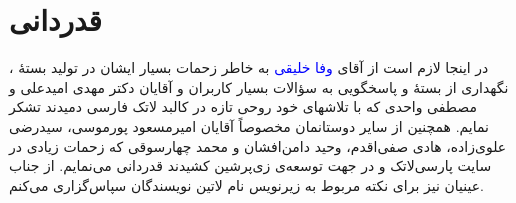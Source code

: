 \documentclass{article}
\theoremstyle{plain}\newtheorem{question}{پرسش}
\begin{document}
\section*{قدردانی}
در اینجا لازم است از آقای \textcolor{blue}{وفا خلیقی} به خاطر زحمات بسیار ایشان در تولید بستهٔ \XePersian، نگهداری از بستهٔ  و پاسخگویی به سؤالات بسیار کاربران و آقایان دکتر مهدی امیدعلی و مصطفی واحدی  که با تلاشهای خود روحی تازه در کالبد لاتک فارسی دمیدند تشکر نمایم. همچنین از سایر دوستانمان مخصوصاً آقایان امیرمسعود پورموسی، سیدرضی علوی‌زاده، هادی صفی‌اقدم، وحید دامن‌افشان و محمد چهارسوقی که زحمات زیادی در سایت پارسی‌لاتک و در جهت توسعه‌ی زی‌پرشین کشیدند قدردانی می‌نمایم. از جناب عینیان نیز برای نکته مربوط به زیرنویس نام لاتین نویسندگان سپاس‌گزاری می‌کنم.


\end{document}
